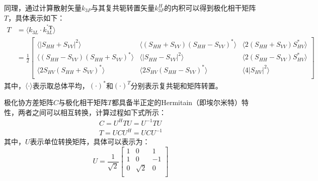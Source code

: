 同理，通过计算散射矢量$k_{3P}$与其复共轭转置矢量$k_{3P}^{H}$的内积可以得到极化相干矩阵$T$，具体表示如下：
\begin{equation}
    \label{eq:T}
    \begin{aligned}
        T & =\left. \langle k_{3L}\cdot k_{3L}^{^*\boldsymbol{T}} \right. \rangle                                                                                                                                                                                                                  \\
          & =\frac{1}{2}\left[ \begin{matrix}
                                       \langle \left| S_{HH}+S_{VV} \right|^2\rangle                                               & \left. \langle \left( S_{HH}+S_{VV} \right) \left( S_{HH}-S_{VV} \right) ^* \right. \rangle & \left. \langle 2\left( S_{HH}+S_{VV} \right) S_{HV}^{*} \right. \rangle \\
                                       \left. \langle \left( S_{HH}-S_{VV} \right) \left( S_{HH}+S_{VV} \right) ^* \right. \rangle & \left. \langle \left| S_{HH}-S_{VV} \right|^2 \right. \rangle                               & \left. \langle 2\left( S_{HH}-S_{VV} \right) S_{HV}^{*} \right. \rangle \\
                                       \left. \langle 2S_{HV}\left( S_{HH}+S_{VV} \right) ^* \right. \rangle                       & \left. \langle 2S_{HV}\left( S_{HH}-S_{VV} \right) ^* \right. \rangle                       & \left. \langle 4\left| S_{HV} \right|^2 \right. \rangle                 \\
                                   \end{matrix} \right]
    \end{aligned}
\end{equation}
其中，$\langle \cdot \rangle$表示取总体平均，$(\cdot)^*$和$(\cdot)^T$分别表示复共轭和矩阵转置。

极化协方差矩阵$C$与极化相干矩阵$T$都具备半正定的Hermitain（即埃尔米特）特性，两者之间可以相互转换，计算过程如下式所示：
\begin{gather}
    C=U^H T U=U^{-1} T U \\
    T=U C U^H=U C U^{-1}
\end{gather}
其中，$U$表示单位转换矩阵，具体可以表示为：
\begin{equation}
    U=\frac{1}{\sqrt{2}}\left[ \begin{matrix}
            1 & 0        & 1  \\
            1 & 0        & -1 \\
            0 & \sqrt{2} & 0  \\
        \end{matrix} \right]
\end{equation}

